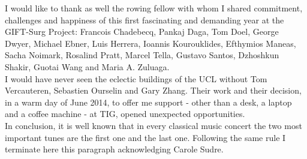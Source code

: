 I would like to thank as well the rowing fellow with whom I shared commitment, challenges and happiness of this first fascinating and demanding year at the GIFT-Surg Project: 
Francois Chadebecq, 
Pankaj Daga, 
Tom Doel, 
George Dwyer,
Michael Ebner,
Luis Herrera,
Ioannis Kourouklides,
Efthymios Maneas,
Sacha Noimark,
Rosalind Pratt,
Marcel Tella,
Gustavo Santos,
Dzhoshkun Shakir,
Guotai Wang and Maria A. Zuluaga.\\
I would have never seen the eclectic buildings of the UCL without Tom Vercauteren, Sebastien Ourselin and Gary Zhang. Their work and their decision, in a warm day of June 2014, to offer me support - other than a desk, a laptop and a coffee machine -  at TIG, opened unexpected opportunities.\\

In conclusion, it is well known that in every classical music concert the two most important tunes are the first one and the last one. Following the same rule I terminate here this paragraph acknowledging Carole Sudre.




